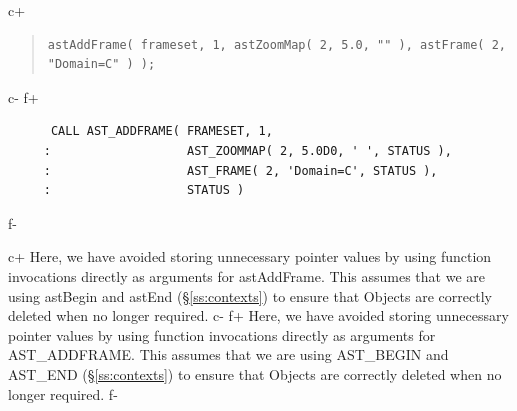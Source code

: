 \documentclass[twoside,11pt]{article}
\newcommand{\secref}[1]{\S\ref{#1}}
\newcommand{\secref}[1]{\ref{#1}}
\begin{document}
c+
\begin{quote}
\small
\begin{verbatim}
astAddFrame( frameset, 1, astZoomMap( 2, 5.0, "" ), astFrame( 2, "Domain=C" ) );
\end{verbatim}
\normalsize
\end{quote}
c-
f+
\small
\begin{verbatim}
      CALL AST_ADDFRAME( FRAMESET, 1,
     :                   AST_ZOOMMAP( 2, 5.0D0, ' ', STATUS ),
     :                   AST_FRAME( 2, 'Domain=C', STATUS ),
     :                   STATUS )
\end{verbatim}
\normalsize
f-

c+
Here, we have avoided storing unnecessary pointer values by using
function invocations directly as arguments for astAddFrame. This
assumes that we are using astBegin and astEnd (\secref{ss:contexts}) to
ensure that Objects are correctly deleted when no longer required.
c-
f+
Here, we have avoided storing unnecessary pointer values by using
function invocations directly as arguments for AST\_ADDFRAME. This
assumes that we are using AST\_BEGIN and AST\_END
(\secref{ss:contexts}) to ensure that Objects are correctly deleted
when no longer required.
f-
\end{document}

